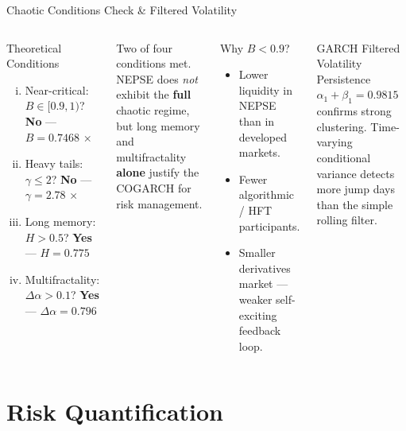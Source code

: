\documentclass[10pt, aspectratio=169]{beamer}
\begin{document}
\begin{frame}{Chaotic Conditions Check \& Filtered Volatility}
\begin{columns}[T]
  \begin{alertblock}{Theoretical Conditions \cite{kluppelberg2004continuous}}
    \begin{enumerate}[(i)]\small
      \item Near-critical: $B\in[0.9,1)$?
            \textbf{No} — $B=0.7468$ \quad $\times$
      \item Heavy tails: $\gamma\le 2$?
            \textbf{No} — $\gamma=2.78$ \quad $\times$
      \item Long memory: $H>0.5$?
            \textbf{Yes} — $H=0.775$ \quad \checkmark
      \item Multifractality: $\Delta\alpha>0.1$?
            \textbf{Yes} — $\Delta\alpha=0.796$ \quad \checkmark
    \end{enumerate}
  \end{alertblock}
  \vspace{0.2cm}
  Two of four conditions met.  NEPSE does \emph{not} exhibit the
  \textbf{full} chaotic regime, but long memory and multifractality
  \textbf{alone} justify the COGARCH for risk management.
  \begin{block}{Why $B<0.9$? \cite{hardiman2013critical}}
    \begin{itemize}\small
      \item Lower liquidity in NEPSE than in developed markets.
      \item Fewer algorithmic / HFT participants.
      \item Smaller derivatives market — weaker self-exciting
            feedback loop.
    \end{itemize}
  \end{block}
  \vspace{0.2cm}
  \begin{block}{GARCH Filtered Volatility}
    Persistence $\alpha_1+\beta_1=0.9815$ confirms strong
    clustering.  Time-varying conditional variance detects more
    jump days than the simple rolling filter.
  \end{block}
\end{columns}
\end{frame}

\section{Risk Quantification}
\end{document}
